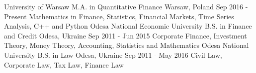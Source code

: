 \begin{cvsection}[Education]
  \cvexperience
    {University of Warsaw}
    {M.A. in Quantitative Finance}
    {Warsaw, Poland}
    {Sep 2016 - Present}
    {
      Mathematics in Finance, Statistics, Financial Markets, Time Series Analysis, C++ and Python
    }
  \cvexperience
    {Odesa National Economic University}
    {B.S. in Finance and Credit}
    {Odesa, Ukraine}
    {Sep 2011 - Jun 2015}
    {
      Corporate Finance, Investment Theory, Money Theory, Accounting, Statistics and Mathematics
    }
  \cvexperience
    {Odesa National University}
    {B.S. in Law}
    {Odesa, Ukraine}
    {Sep 2011 - May 2016}
    {
      Civil Law, Corporate Law, Tax Law, Finance Law
    }

\end{cvsection}
